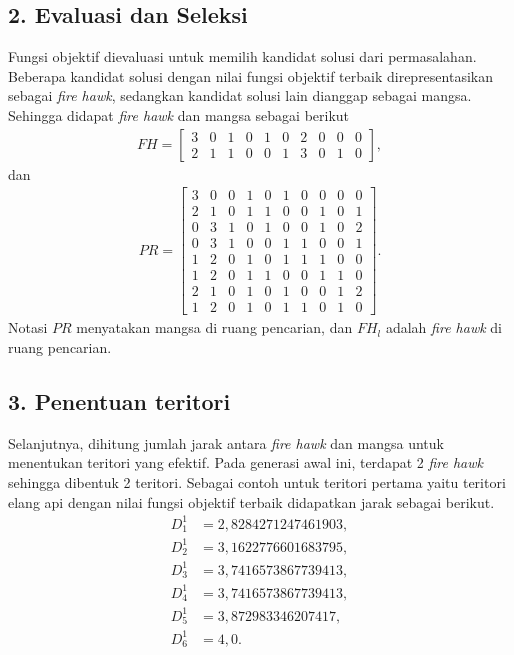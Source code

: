 \begin{contoh}
\subsection*{2. Evaluasi dan Seleksi}
Fungsi objektif dievaluasi untuk memilih kandidat solusi dari permasalahan. Beberapa kandidat solusi dengan nilai fungsi objektif terbaik direpresentasikan sebagai \textit{fire hawk}, sedangkan kandidat solusi lain dianggap sebagai mangsa. Sehingga didapat \textit{fire hawk} dan mangsa sebagai berikut
\begin{align*}
    FH = \begin{bmatrix}
    3 & 0 & 1 & 0 & 1 & 0 & 2 & 0 & 0 & 0\\
    2 & 1 & 1 & 0 & 0 & 1 & 3 & 0 & 1 & 0    
\end{bmatrix},
\end{align*}
dan
\begin{align*}
    PR = \begin{bmatrix}
    3 & 0 & 0 & 1 & 0 & 1 & 0 & 0 & 0 & 0 \\
    2 & 1 & 0 & 1 & 1 & 0 & 0 & 1 & 0 & 1 \\
    0 & 3 & 1 & 0 & 1 & 0 & 0 & 1 & 0 & 2 \\
    0 & 3 & 1 & 0 & 0 & 1 & 1 & 0 & 0 & 1 \\
    1 & 2 & 0 & 1 & 0 & 1 & 1 & 1 & 0 & 0 \\
    1 & 2 & 0 & 1 & 1 & 0 & 0 & 1 & 1 & 0 \\
    2 & 1 & 0 & 1 & 0 & 1 & 0 & 0 & 1 & 2 \\
    1 & 2 & 0 & 1 & 0 & 1 & 1 & 0 & 1 & 0
\end{bmatrix}.
\end{align*}
Notasi $PR$ menyatakan mangsa di ruang pencarian, dan $FH_l$ adalah \textit{fire hawk} di ruang pencarian.
\subsection*{3. Penentuan teritori}
Selanjutnya, dihitung jumlah jarak antara \textit{fire hawk} dan mangsa untuk menentukan teritori yang efektif. Pada generasi awal ini, terdapat 2 \textit{fire hawk} sehingga dibentuk 2 teritori. Sebagai contoh untuk teritori pertama yaitu teritori elang api dengan nilai fungsi objektif terbaik didapatkan jarak sebagai berikut.
\begin{align*}
    D_1^1 &= 2,8284271247461903,\\
    D_2^1 &= 3,1622776601683795,\\
    D_3^1 &= 3,7416573867739413,\\
    D_4^1 &= 3,7416573867739413,\\
    D_5^1 &= 3,872983346207417,\\
    D_6^1 &= 4,0.
\end{align*}


\end{contoh}
